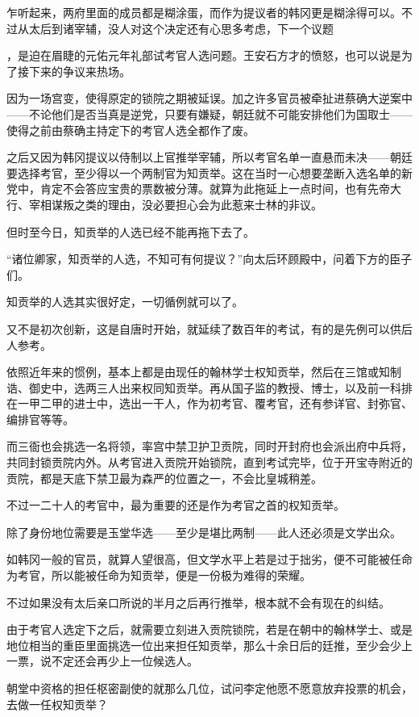 乍听起来，两府里面的成员都是糊涂蛋，而作为提议者的韩冈更是糊涂得可以。不过从太后到诸宰辅，没人对这个决定还有心思多考虑，下一个议题

，是迫在眉睫的元佑元年礼部试考官人选问题。王安石方才的愤怒，也可以说是为了接下来的争议来热场。

因为一场宫变，使得原定的锁院之期被延误。加之许多官员被牵扯进蔡确大逆案中——不论他们是否当真是逆党，只要有嫌疑，朝廷就不可能安排他们为国取士——使得之前由蔡确主持定下的考官人选全都作了废。

之后又因为韩冈提议以侍制以上官推举宰辅，所以考官名单一直悬而未决——朝廷要选择考官，至少得以一个两制官为知贡举。这在当时一心想要垄断入选名单的新党中，肯定不会答应宝贵的票数被分薄。就算为此拖延上一点时间，也有先帝大行、宰相谋叛之类的理由，没必要担心会为此惹来士林的非议。

但时至今日，知贡举的人选已经不能再拖下去了。

“诸位卿家，知贡举的人选，不知可有何提议？”向太后环顾殿中，问着下方的臣子们。

知贡举的人选其实很好定，一切循例就可以了。

又不是初次创新，这是自唐时开始，就延续了数百年的考试，有的是先例可以供后人参考。

依照近年来的惯例，基本上都是由现任的翰林学士权知贡举，然后在三馆或知制诰、御史中，选两三人出来权同知贡举。再从国子监的教授、博士，以及前一科排在一甲二甲的进士中，选出一干人，作为初考官、覆考官，还有参详官、封弥官、编排官等等。

而三衙也会挑选一名将领，率宫中禁卫护卫贡院，同时开封府也会派出府中兵将，共同封锁贡院内外。从考官进入贡院开始锁院，直到考试完毕，位于开宝寺附近的贡院，都是天底下禁卫最为森严的位置之一，不会比皇城稍差。

不过一二十人的考官中，最为重要的还是作为考官之首的权知贡举。

除了身份地位需要是玉堂华选——至少是堪比两制——此人还必须是文学出众。

如韩冈一般的官员，就算人望很高，但文学水平上若是过于拙劣，便不可能被任命为考官，所以能被任命为知贡举，便是一份极为难得的荣耀。

不过如果没有太后亲口所说的半月之后再行推举，根本就不会有现在的纠结。

由于考官人选定下之后，就需要立刻进入贡院锁院，若是在朝中的翰林学士、或是地位相当的重臣里面挑选一位出来担任知贡举，那么十余日后的廷推，至少会少上一票，说不定还会再少上一位候选人。

朝堂中资格的担任枢密副使的就那么几位，试问李定他愿不愿意放弃投票的机会，去做一任权知贡举？

